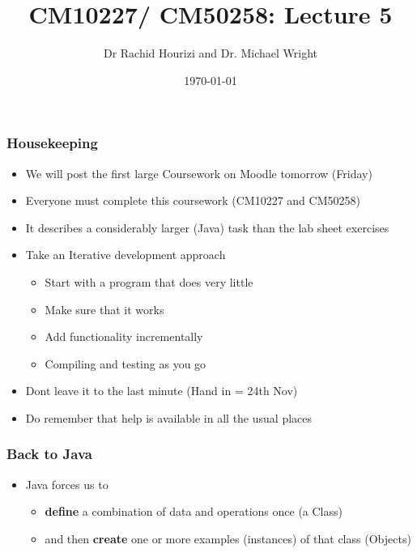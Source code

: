 \documentclass{beamer}
\begin{document}

\title{CM10227/ CM50258: Lecture 5}
\author{Dr Rachid Hourizi and Dr. Michael Wright}
\date{\today}
\frame{\titlepage}

\begin{frame}
\frametitle{Housekeeping}
\begin{itemize}
\item We will post the first large Coursework on Moodle tomorrow (Friday)
\item Everyone must complete this coursework (CM10227 and CM50258)
\item It describes a considerably larger (Java) task than the lab sheet exercises
\item Take an Iterative development approach 
\begin{itemize}
\item Start with a program that does very little
\item Make sure that it works
\item Add functionality incrementally
\item Compiling and testing as you go
\end{itemize}
\item Dont leave it to the last minute (Hand in = 24th Nov)
\item Do remember that help is available in all the usual places
\end{itemize}
\end{frame}

\begin{frame}
\frametitle{Back to Java}
\begin{itemize}
\item Java forces us to 
\begin{itemize}
\item \textbf{define} a combination of data and operations once (a \alert{Class})
\item and then \textbf{create} one or more examples (instances) of that class (\alert{Objects})
\end{itemize}
\end{itemize}
\end{frame}
\end{document}
